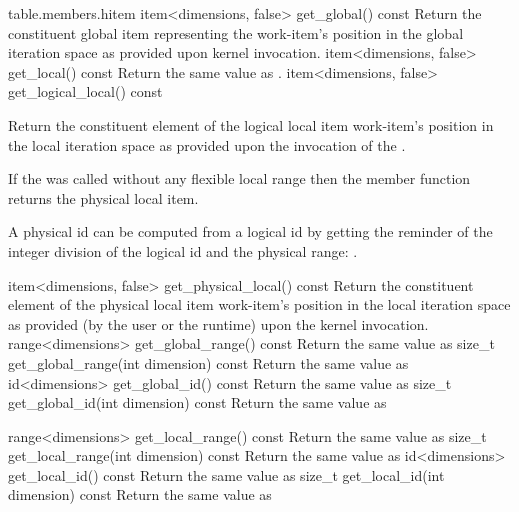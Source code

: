 {table.members.hitem}
  \addRow
    {item<dimensions, false> get_global() const}
    {
        Return the constituent global \gls{item} representing the
        work-item's position in the global iteration space as provided upon kernel invocation.
    }
  \addRow
    {item<dimensions, false> get_local() const}
    {
        Return the same value as .
    }
  \addRow
    {item<dimensions, false> get_logical_local() const}
    {
        Return the constituent element of the logical local \gls{item}
        work-item's position in the local iteration space as provided upon the invocation of the
        .

        If the  was called without any flexible local range
        then the member function returns the physical local \gls{item}.

        A physical id can be computed from a logical id by getting the reminder of the integer division
        of the logical id and the physical range:
        .
    }
  \addRow
    {item<dimensions, false> get_physical_local() const}
    {
        Return the constituent element of the physical local \gls{item}
        work-item's position in the local iteration space as provided (by the user or the runtime)
        upon the kernel invocation.
    }
  \addRow
    {range<dimensions> get_global_range() const}
    {
      Return the same value as 
    }
  \addRow
    {size_t get_global_range(int dimension) const}
    {
      Return the same value as 
    }
  \addRow
    {id<dimensions> get_global_id() const}
    {
      Return the same value as 
    }
  \addRow
    {size_t get_global_id(int dimension) const}
    {
      Return the same value as 
    }

  \addRow
    {range<dimensions> get_local_range() const}
    {
      Return the same value as 
    }
  \addRow
    {size_t get_local_range(int dimension) const}
    {
      Return the same value as 
    }
  \addRow
    {id<dimensions> get_local_id() const}
    {
      Return the same value as 
    }
  \addRow
    {size_t get_local_id(int dimension) const}
    {
      Return the same value as 
    }

